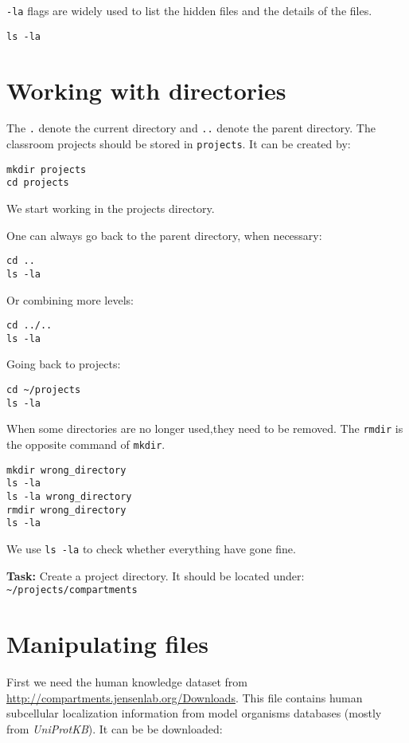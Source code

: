 \documentclass{article}\usepackage[]{graphicx}\usepackage[usenames,dvipsnames]{color}
\begin{document}
\verb+-la+ flags are widely used to list the hidden files and the details of the files. 

\begin{verbatim}
ls -la
\end{verbatim}

\section{Working with directories}

The \verb+.+ denote the current directory and \verb+..+ denote the parent directory. The classroom projects should be stored in \verb+projects+. It can be created by:

\begin{verbatim}
mkdir projects
cd projects
\end{verbatim}

We start working in the projects directory.

One can always go back to the parent directory, when necessary:
\begin{verbatim}
cd ..
ls -la
\end{verbatim}

Or combining more levels:

\begin{verbatim}
cd ../..
ls -la
\end{verbatim}

Going back to projects:

\begin{verbatim}
cd ~/projects
ls -la
\end{verbatim}

When some directories are no longer used,they need to be removed. The \verb+rmdir+ is the opposite command of \verb+mkdir+.

\begin{verbatim}
mkdir wrong_directory
ls -la
ls -la wrong_directory
rmdir wrong_directory
ls -la
\end{verbatim}

We use \verb+ls -la+ to check whether everything have gone fine.

\textbf{Task:} Create a project directory. It should be located under: \verb+~/projects/compartments+

\section{Manipulating files}

First we need the human knowledge dataset from \href{http://compartments.jensenlab.org/Downloads}{http://compartments.jensenlab.org/Downloads}. This file contains human subcellular localization information from model organisms databases (mostly from \emph{UniProtKB}). It can be be downloaded:
\end{document}
